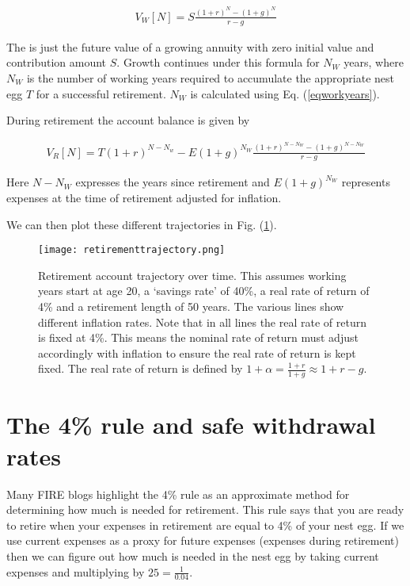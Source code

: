 \documentclass[12pt]{article}
\begin{document}
\begin{align}
V_W[N] = S\frac{(1+r)^N - (1+g)^N}{r-g}
\end{align}

The is just the future value of a growing annuity with zero initial value and contribution amount $S$.
Growth continues under this formula for $N_W$ years, where $N_W$ is the number of working years required to accumulate the appropriate nest egg $T$ for a successful retirement.
$N_W$ is calculated using Eq. (\ref{eqworkyears}).

During retirement the account balance is given by

\begin{align}
V_R[N] = T(1+r)^{N-N_w} - E(1+g)^{N_W} \frac{(1+r)^{N-N_W} - (1+g)^{N-N_W}}{r-g}
\end{align}

Here $N-N_W$ expresses the years since retirement and $E(1+g)^{N_W}$ represents expenses at the time of retirement adjusted for inflation.

We can then plot these different trajectories in Fig. (\ref{figtraj}).

\begin{figure}
  \texttt{[image: retirementtrajectory.png]}
  \caption{Retirement account trajectory over time. This assumes working years start at age 20, a `savings rate' of 40\%, a real rate of return of 4\% and a retirement length of 50 years. The various lines show different inflation rates. Note that in all lines the real rate of return is fixed at 4\%. This means the nominal rate of return must adjust accordingly with inflation to ensure the real rate of return is kept fixed. The real rate of return is defined by $1+\alpha = \frac{1+r}{1+g} \approx 1+r-g$.}
  \label{figtraj}
\end{figure}

\section{The 4\% rule and safe withdrawal rates}

Many FIRE blogs highlight the 4\% rule as an approximate method for determining how much is needed for retirement. 
This rule says that you are ready to retire when your expenses in retirement are equal to 4\% of your nest egg.
If we use current expenses as a proxy for future expenses (expenses during retirement) then we can figure out how much is needed in the nest egg by taking current expenses and multiplying by $25 = \frac{1}{0.04}$.
\end{document}
